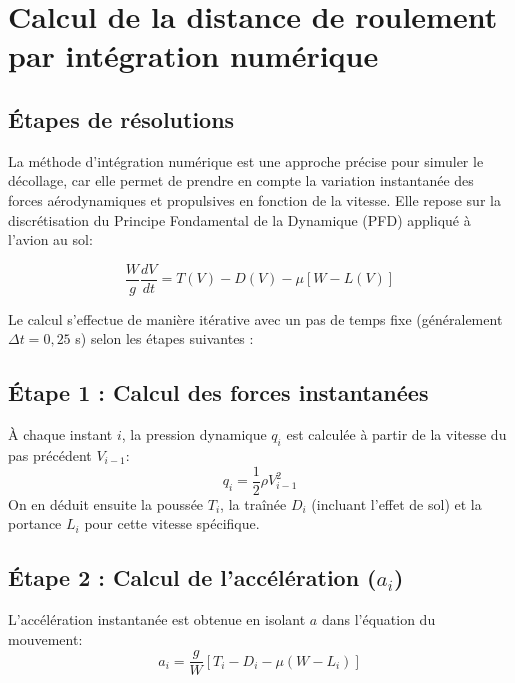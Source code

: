 				
			
		
			
			
			
			
			
			\vspace*{2cm}
			
	
		
		
		
		\section{Calcul de la distance de roulement par intégration numérique}
		
		\subsection{Étapes de résolutions}
		
		La méthode d'intégration numérique est une approche précise pour simuler le décollage, car elle permet de prendre en compte la variation instantanée des forces aérodynamiques et propulsives en fonction de la vitesse. Elle repose sur la discrétisation du Principe Fondamental de la Dynamique (PFD) appliqué à l'avion au sol:
		
		\[ \frac{W}{g} \frac{dV}{dt} = T(V) - D(V) - \mu \left[ W - L(V) \right]  \]
		
		Le calcul s'effectue de manière itérative avec un pas de temps fixe (généralement $\Delta t = 0{,}25$ s) selon les étapes suivantes  :
		
		\subsection*{Étape 1 : Calcul des forces instantanées}
		À chaque instant $i$, la pression dynamique $q_i$ est calculée à partir de la vitesse du pas précédent $V_{i-1}$:
		\[ q_i = \frac{1}{2} \rho V_{i-1}^2 \]
		On en déduit ensuite la poussée $T_i$, la traînée $D_i$ (incluant l'effet de sol) et la portance $L_i$ pour cette vitesse spécifique.
		
		\subsection*{Étape 2 : Calcul de l'accélération ($a_i$)}
		L'accélération instantanée est obtenue en isolant $a$ dans l'équation du mouvement:
		\[ a_i = \frac{g}{W} \left[ T_i - D_i - \mu(W - L_i) \right]  \]
		
